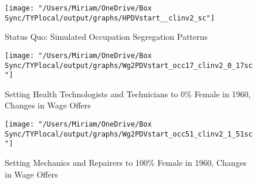\documentclass[12pt]{article}
\begin{document}
\begin{center}
\begin{figure}[H]
\centering
\caption{Status Quo: Simulated Occupation Segregation Patterns}
\label{fig:sq1}
\texttt{[image: "/Users/Miriam/OneDrive/Box Sync/TYPlocal/output/graphs/HPDVstart\_\_clinv2\_sc"]}
\end{figure}

\end{center}

\begin{figure}[H]
\centering
\caption{Setting Health Technologists and Technicians to 0\% Female in 1960, Changes in Wage Offers}
\label{nurses}
\texttt{[image: "/Users/Miriam/OneDrive/Box Sync/TYPlocal/output/graphs/Wg2PDVstart\_occ17\_clinv2\_0\_17sc"]}
\end{figure}
\begin{figure}[H]
\centering
\caption{Setting Mechanics and Repairers to 100\% Female in 1960, Changes in Wage Offers}
\label{mechanics}
\texttt{[image: "/Users/Miriam/OneDrive/Box Sync/TYPlocal/output/graphs/Wg2PDVstart\_occ51\_clinv2\_1\_51sc"]}
\end{figure}
\end{document}
